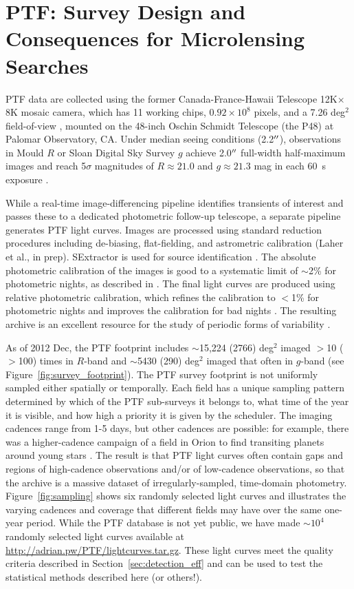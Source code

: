 \documentclass{emulateapj}
\begin{document}
\section{PTF: Survey Design and Consequences for Microlensing Searches}\label{sec:ptf} 
PTF data are collected using the former Canada-France-Hawaii Telescope 12K$\times$8K mosaic camera, which has 11 working chips, $0.92\times10^8$ pixels, and a 7.26 deg$^2$ field-of-view \citep{rahmer2008}, mounted on the 48-inch Oschin Schmidt Telescope (the P48) at Palomar Observatory, CA. Under median seeing conditions (2.2$\mbox{$^{\prime\prime}$}$), observations in Mould $R$ or Sloan Digital Sky Survey \citep[SDSS;][]{york00} $g$ achieve 2.0$\mbox{$^{\prime\prime}$}$ full-width half-maximum images and reach 5$\sigma$ magnitudes of $R \approx 21.0$ and $g \approx 21.3$ mag in each 60~s exposure \citep{nick2009,rau2009,nick2010}. 

While a real-time image-differencing pipeline identifies transients of interest and passes these to a dedicated photometric follow-up telescope, a separate pipeline generates PTF light curves. Images are processed using standard reduction procedures including de-biasing, flat-fielding, and astrometric calibration (Laher et al., in prep). SExtractor is used for source identification \citep{bertin96}. The absolute photometric calibration of the images is good to a systematic limit of $\sim$2\% for photometric nights, as described in \cite{ofek2012}.  The final light curves are produced using relative photometric calibration, which refines the calibration to $<$1\% for photometric nights and improves the calibration for bad nights \citep[Levitan et al., in prep; for algorithm details see][]{levitan2011, ofek2012}. The resulting archive is an excellent resource for the study of periodic forms of variability \citep[e.g., stellar or asteroid rotation;][]{agueros11,polishook2012}. 

As of 2012 Dec, the PTF footprint includes $\sim$15,224 (2766) deg$^2$ imaged $>$10 ($>$100) times in $R$-band and $\sim$5430 (290) deg$^2$ imaged that often in $g$-band (see Figure~\ref{fig:survey_footprint}). The PTF survey footprint is not uniformly sampled either spatially or temporally. Each field has a unique sampling pattern determined by which of the PTF sub-surveys it belongs to, what time of the year it is visible, and how high a priority it is given by the scheduler. The imaging cadences range from 1-5 days, but other cadences are possible: for example, there was a higher-cadence campaign of a field in Orion to find transiting planets around young stars \citep{vaneyken2011}. The result is that PTF light curves often contain gaps and regions of high-cadence observations and/or of low-cadence observations, so that the archive is a massive dataset of irregularly-sampled, time-domain photometry. Figure~\ref{fig:sampling} shows six randomly selected light curves and illustrates the varying cadences and coverage that different fields may have over the same one-year period. While the PTF database is not yet public, we have made $\sim$$10^4$ randomly selected light curves available at \url{http://adrian.pw/PTF/lightcurves.tar.gz}. These light curves meet the quality criteria described in Section~\ref{sec:detection_eff} and can be used to test the statistical methods described here (or others!).
\end{document}
